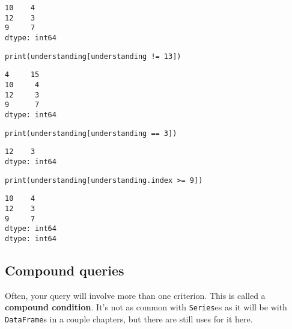 \begin{Verbatim}[fontsize=\small,samepage=true,frame=leftline,framesep=5mm,framerule=1mm]
10    4
12    3
9     7
dtype: int64
\end{Verbatim}

\begin{Verbatim}[fontsize=\small,samepage=true,frame=single,framesep=3mm]
print(understanding[understanding != 13])
\end{Verbatim}
\vspace{-.3in}

\begin{Verbatim}[fontsize=\small,samepage=true,frame=leftline,framesep=5mm,framerule=1mm]
4     15
10     4
12     3
9      7
dtype: int64
\end{Verbatim}

\begin{Verbatim}[fontsize=\small,samepage=true,frame=single,framesep=3mm]
print(understanding[understanding == 3])
\end{Verbatim}
\vspace{-.3in}

\begin{Verbatim}[fontsize=\small,samepage=true,frame=leftline,framesep=5mm,framerule=1mm]
12    3
dtype: int64
\end{Verbatim}

\begin{Verbatim}[fontsize=\small,samepage=true,frame=single,framesep=3mm]
print(understanding[understanding.index >= 9])
\end{Verbatim}
\vspace{-.3in}

\begin{Verbatim}[fontsize=\small,samepage=true,frame=leftline,framesep=5mm,framerule=1mm]
10    4
12    3
9     7
dtype: int64
dtype: int64
\end{Verbatim}


\subsection{Compound queries}

\label{seriesCompoundQueries}

Often, your query will involve more than one criterion. This is called a
\textbf{compound condition}. It's not as common with \texttt{Series}es as it
will be with \texttt{DataFrame}s in a couple chapters, but there are still uses
for it here.

